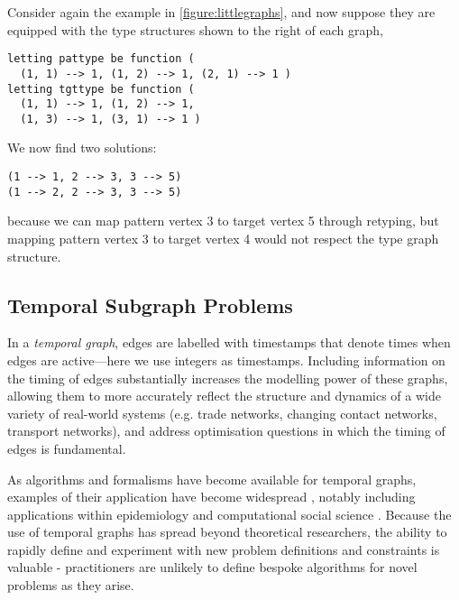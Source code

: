 \documentclass[runningheads]{llncs}
\begin{document}
Consider again the example in \cref{figure:littlegraphs}, and now suppose they are equipped with the type
structures shown to the right of each graph,
\begin{lstlisting}
letting pattype be function (
  (1, 1) --> 1, (1, 2) --> 1, (2, 1) --> 1 )
letting tgttype be function (
  (1, 1) --> 1, (1, 2) --> 1,
  (1, 3) --> 1, (3, 1) --> 1 )
\end{lstlisting}
We now find two solutions:
\begin{lstlisting}
(1 --> 1, 2 --> 3, 3 --> 5)
(1 --> 2, 2 --> 3, 3 --> 5)
\end{lstlisting}
because we can map pattern vertex 3 to target vertex 5 through retyping, but mapping pattern vertex 3
to target vertex 4 would not respect the type graph structure.

\subsection{Temporal Subgraph Problems}\label{section:temporalgraphs}
In a \emph{temporal graph}, edges are labelled with timestamps that denote times when edges are active---here we use
integers as timestamps.  Including information on the timing of edges substantially increases the modelling power of these graphs, allowing them to 
more accurately reflect the structure and dynamics of a wide variety of real-world systems (e.g. trade networks, changing contact networks, transport networks), 
and address optimisation questions in which the timing of edges is fundamental.  

As algorithms and formalisms have become available for temporal graphs, examples of their application have become widespread \cite{holmeReview}, 
notably including applications within epidemiology \cite{temporalEpi} and computational social science \cite{socialTemporalCite}.
Because the use of temporal graphs has spread beyond theoretical researchers, the ability to rapidly define and experiment with 
new problem definitions and constraints is valuable - practitioners are unlikely to define bespoke algorithms for novel problems as they arise.

\end{document}
